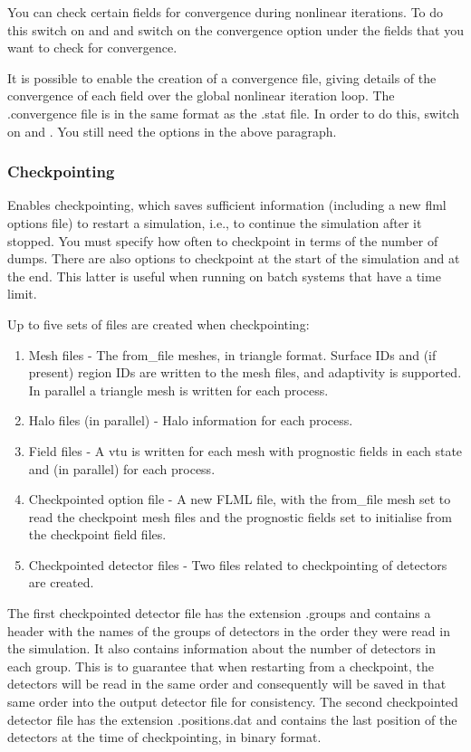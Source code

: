 You can check certain fields for convergence during nonlinear iterations.  To do this switch on  and  and switch on the convergence option under the fields that you want to check for convergence. 

It is possible to enable the creation of a convergence file, giving details of the convergence of each field over the global nonlinear iteration loop. The .convergence file is in the same format as the .stat file. In order to do this, switch on 
  and .  You still need the options in the above paragraph.

\subsubsection{Checkpointing}
\label{sect:configuring_fluidity_checkpointing}
Enables checkpointing, which saves sufficient information (including a new flml options file) to restart a simulation, i.e., to continue the simulation after it stopped. You must specify how often to checkpoint in terms of the number of dumps. There
are also options to checkpoint at the start of the simulation and at the
end. This latter is useful when running on batch systems that have a time
limit.

Up to five sets of files are created when checkpointing:
\begin{enumerate}
\item Mesh files - The from\_file meshes, in triangle format. Surface IDs
  and (if present) region IDs are written to the mesh files, and adaptivity
  is supported. In parallel a triangle mesh is written for each process.
\item Halo files (in parallel) - Halo information for each process.
\item Field files - A vtu is written for each mesh with prognostic fields in
  each state and (in parallel) for each process.
\item Checkpointed option file - A new FLML file, with the from\_file mesh
  set to read the checkpoint mesh files and the prognostic fields set
  to initialise from the checkpoint field files.
\item Checkpointed detector files - Two files related to checkpointing of
  detectors are created.
\end{enumerate}

The first checkpointed detector file has the extension .groups and contains
a header with the names of the groups of detectors in the order they were
read in the simulation. It also contains information about the number of
detectors in each group. This is to guarantee that when restarting from a
checkpoint, the detectors will be read in the same order and consequently
will be saved in that same order into the output detector file for
consistency.  The second checkpointed detector file has the extension
.positions.dat and contains the last position of the detectors at the time 
of checkpointing, in binary format.

